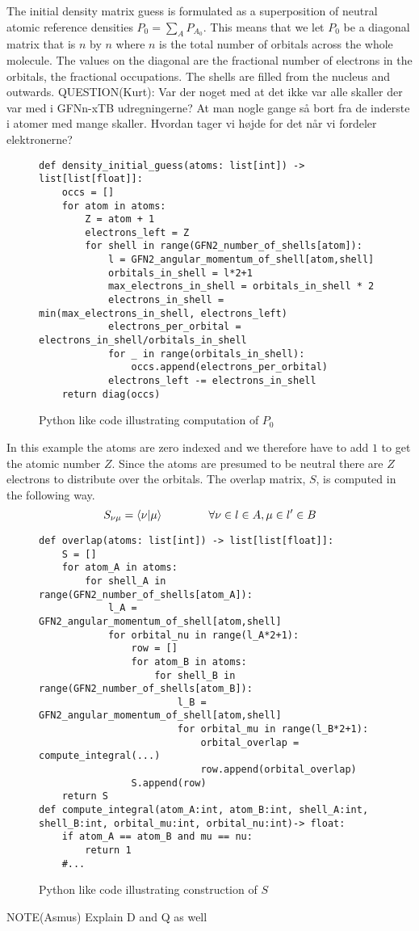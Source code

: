The initial density matrix guess is formulated as a superposition of neutral atomic reference densities $P_0 = \sum_{A}P_{A_0}$. This means that we let $P_0$ be a diagonal matrix that is $n$ by $n$ where $n$ is the total number of orbitals across the whole molecule. The values on the diagonal are the fractional number of electrons in the orbitals, the fractional occupations. The shells are filled from the nucleus and outwards. QUESTION(Kurt): Var der noget med at det ikke var alle skaller der var med i GFNn-xTB udregningerne? At man nogle gange så bort fra de inderste i atomer med mange skaller. Hvordan tager vi højde for det når vi fordeler elektronerne?
\begin{figure}[H]
\begin{verbatim}
def density_initial_guess(atoms: list[int]) -> list[list[float]]:
    occs = []
    for atom in atoms:
        Z = atom + 1
        electrons_left = Z
        for shell in range(GFN2_number_of_shells[atom]):
            l = GFN2_angular_momentum_of_shell[atom,shell] 
            orbitals_in_shell = l*2+1 
            max_electrons_in_shell = orbitals_in_shell * 2
            electrons_in_shell = min(max_electrons_in_shell, electrons_left)
            electrons_per_orbital = electrons_in_shell/orbitals_in_shell
            for _ in range(orbitals_in_shell):
                occs.append(electrons_per_orbital)
            electrons_left -= electrons_in_shell
    return diag(occs)
\end{verbatim}
\caption{Python like code illustrating computation of $P_0$}
\end{figure}
In this example the atoms are zero indexed and we therefore have to add $1$ to get the atomic number $Z$. 
Since the atoms are presumed to be neutral there are $Z$ electrons to distribute over the orbitals.
The overlap matrix, $S$, is computed in the following way.
\begin{equation}
S_{\nu\mu} = \braket{\nu|\mu}\quad\quad\quad\quad\forall \nu \in l \in A,\mu \in l' \in B
\end{equation}
\begin{figure}[H]
\begin{verbatim}
def overlap(atoms: list[int]) -> list[list[float]]:
    S = []
    for atom_A in atoms:
        for shell_A in range(GFN2_number_of_shells[atom_A]):
            l_A = GFN2_angular_momentum_of_shell[atom,shell] 
            for orbital_nu in range(l_A*2+1):
                row = []
                for atom_B in atoms:
                    for shell_B in range(GFN2_number_of_shells[atom_B]):
                        l_B = GFN2_angular_momentum_of_shell[atom,shell] 
                        for orbital_mu in range(l_B*2+1):
                            orbital_overlap = compute_integral(...)
                            row.append(orbital_overlap)
                S.append(row)
    return S
def compute_integral(atom_A:int, atom_B:int, shell_A:int, shell_B:int, orbital_mu:int, orbital_nu:int)-> float:
    if atom_A == atom_B and mu == nu:
        return 1
    #...
\end{verbatim}
\caption{Python like code illustrating construction of $S$}
\end{figure}
NOTE(Asmus) Explain D and Q as well


